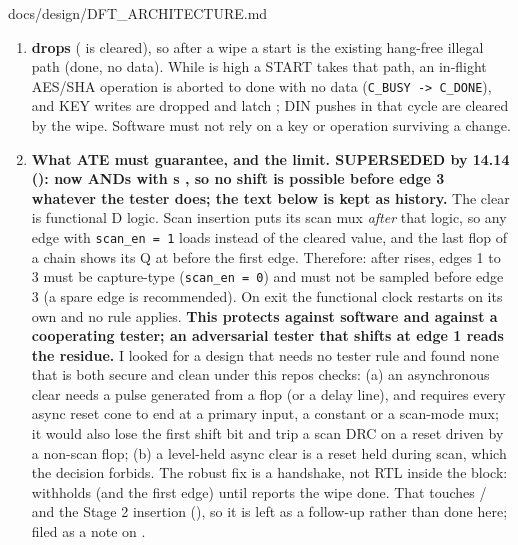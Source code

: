 \begin{relocated}{docs/design/DFT_ARCHITECTURE.md}
\begin{enumerate}
  .
\item
  \textbf{ drops} ( is cleared), so
  after a wipe a start is the existing hang-free illegal path (done, no
  data). While  is high a START takes that path, an
  in-flight AES/SHA operation is aborted to done with no data
  (\texttt{C\_\allowbreak{}BUSY\ -\allowbreak{}>\ C\_\allowbreak{}DONE}),
  and KEY writes are dropped and latch ; DIN
  pushes in that cycle are cleared by the wipe. Software must not rely
  on a key or operation surviving a  change.
\item
  \textbf{What ATE must guarantee, and the limit. SUPERSEDED by 14.14
  ():  now ANDs  with
  \textquotesingle s , so no
  shift is possible before edge 3 whatever the tester does; the text
  below is kept as history.} The clear is functional D logic. Scan
  insertion puts its scan mux \emph{after} that logic, so any edge with
  \texttt{scan\_\allowbreak{}en\ =\allowbreak{}\ 1} loads 
  instead of the cleared value, and the last flop of a chain shows its Q
  at  before the first edge. Therefore: after
   rises, edges 1 to 3 must be capture-type
  (\texttt{scan\_\allowbreak{}en\ =\allowbreak{}\ 0}) and
   must not be sampled before edge 3 (a spare edge is
  recommended). On exit the functional clock restarts on its own and no
  rule applies. \textbf{This protects against software and against a
  cooperating tester; an adversarial tester that shifts at edge 1 reads
  the residue.} I looked for a design that needs no tester rule and
  found none that is both secure and clean under this
  repo\textquotesingle s checks: (a) an asynchronous clear needs a pulse
  generated from a flop (or a delay line), and
   requires every async reset cone to end at
  a primary input, a constant or a scan-mode mux; it would also lose the
  first shift bit and trip a scan DRC on a reset driven by a non-scan
  flop; (b) a level-held async clear is a reset held during scan, which
  the decision forbids. The robust fix is a handshake, not RTL inside
  the block:  withholds  (and the first
   edge) until  reports the wipe done.
  That touches / and the Stage 2 insertion
  (), so it is left as a follow-up rather than done here;
  filed as a note on .

\end{enumerate}
\end{relocated}
